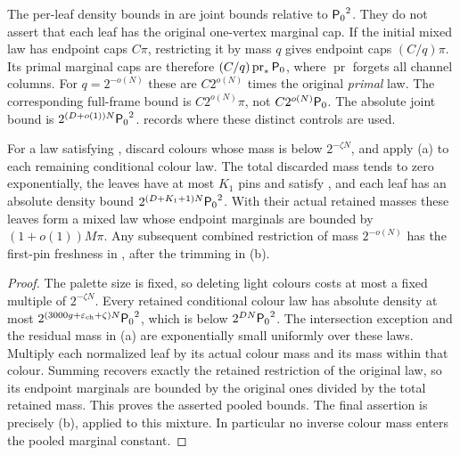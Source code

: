 The per-leaf density bounds in  are joint bounds relative to \({\mathsf P_0}^2\).
They do not assert that each leaf has the original one-vertex marginal cap.
If the initial mixed law has endpoint caps \(C\pi\), restricting it by
mass \(q\) gives endpoint caps \((C/q)\pi\).  Its primal marginal caps
are therefore \((C/q)\operatorname{pr}_*{\mathsf P_0}\), where
\(\operatorname{pr}\) forgets all channel columns.  For \(q=2^{-o(N)}\)
these are \(C2^{o(N)}\) times the original \emph{primal} law.
The corresponding full-frame bound is \(C2^{o(N)}\pi\), not
\(C2^{o(N)}{\mathsf P_0}\).  The absolute joint bound is
\(2^{(D+o(1))N}{\mathsf P_0}^2\).
 records where these distinct controls are used.

\begin{corollary}\label{cor:coloured-peeling}
For a law satisfying , discard colours whose
mass is below \(2^{-\zeta N}\), and apply (a) to each
remaining conditional colour law.  The total discarded mass tends to
zero exponentially, the leaves have at most \(K_1\) pins and satisfy
, and each leaf has an absolute density bound
\(2^{(D+K_1+1)N}{\mathsf P_0}^2\).  With their actual retained masses these
leaves form a mixed law whose endpoint marginals are bounded by
\((1+o(1))M\pi\).  Any subsequent combined restriction of mass
\(2^{-o(N)}\) has the first-pin freshness in
, after the trimming in
(b).
\end{corollary}
\begin{proof}
The palette size is fixed, so deleting light colours costs at most a
fixed multiple of \(2^{-\zeta N}\).  Every retained conditional colour
law has absolute density at most
\(2^{(3000g+\varepsilon_{\rm ch}+\zeta)N}{\mathsf P_0}^2\), which is below
\(2^{DN}{\mathsf P_0}^2\).  The intersection exception and the residual
mass in (a) are exponentially small uniformly over
these laws.  Multiply each normalized leaf by its actual colour mass
and its mass within that colour.  Summing recovers exactly the retained
restriction of the original law, so its endpoint marginals are bounded
by the original ones divided by the total retained mass.  This proves
the asserted pooled bounds.  The final assertion is precisely
(b), applied to this mixture.  In particular no inverse
colour mass enters the pooled marginal constant.
\end{proof}

